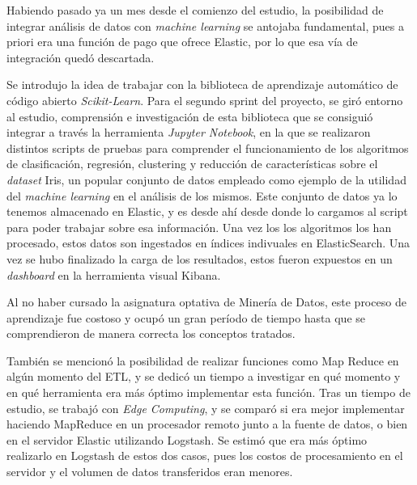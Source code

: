 Habiendo pasado ya un mes desde el comienzo del estudio, la posibilidad de integrar análisis de datos con \textit{machine learning} se antojaba fundamental, pues a priori era una función de pago que ofrece Elastic, por lo que esa vía de integración quedó descartada.

Se introdujo la idea de trabajar con la biblioteca de aprendizaje automático de código abierto \textit{Scikit-Learn}. Para el segundo sprint del proyecto, se giró entorno al estudio, comprensión e investigación de esta biblioteca que se consiguió integrar a través la herramienta \textit{Jupyter Notebook}, en la que se realizaron distintos scripts de pruebas para comprender el funcionamiento de los algoritmos de clasificación, regresión, clustering y reducción de características sobre el \textit{dataset} Iris, un popular conjunto de datos empleado como ejemplo de la utilidad del \textit{machine learning} en el análisis de los mismos. Este conjunto de datos ya lo tenemos almacenado en Elastic, y es desde ahí desde donde lo cargamos al script para poder trabajar sobre esa información. Una vez los los algoritmos los han procesado, estos datos son ingestados en índices indivuales en ElasticSearch. Una vez se hubo finalizado la carga de los resultados, estos fueron expuestos en un \textit{dashboard} en la herramienta visual Kibana. 

Al no haber cursado la asignatura optativa de Minería de Datos, este proceso de aprendizaje fue costoso y ocupó un gran período de tiempo hasta que se comprendieron de manera correcta los conceptos tratados.

También se mencionó la posibilidad de realizar funciones como Map Reduce en algún momento del ETL, y se dedicó un tiempo a investigar en qué momento y en qué herramienta era más óptimo implementar esta función. Tras un tiempo de estudio, se trabajó con \textit{Edge Computing}, y se comparó si era mejor implementar haciendo MapReduce en un procesador remoto junto a la fuente de datos, o bien en el servidor Elastic utilizando Logstash. Se estimó que era más óptimo realizarlo en Logstash de estos dos casos, pues los costos de procesamiento en el servidor y el volumen de datos transferidos eran menores. 

\paragraph{}
\paragraph{}


